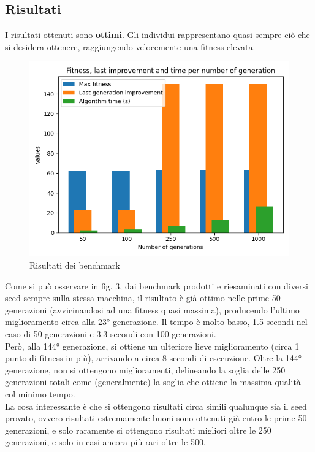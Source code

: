 \documentclass[12pt,titlepage]{article}
\begin{document}
\subsection {Risultati}

I risultati ottenuti sono \textbf{ottimi}. Gli individui rappresentano quasi sempre ciò che si desidera ottenere, raggiungendo velocemente una fitness elevata.\\

\begin{figure}[H]
    \centering
    \includegraphics[width=0.75\linewidth]{assets/benchmark.png}
    \caption{Risultati dei benchmark}
\end{figure}


\noindent Come si può osservare in fig. 3, dai benchmark prodotti e riesaminati con diversi seed sempre sulla stessa macchina, il risultato è già ottimo nelle prime 50 generazioni (avvicinandosi ad una fitness quasi massima), producendo l'ultimo miglioramento circa alla 23° generazione. Il tempo è molto basso, 1.5 secondi nel caso di 50 generazioni e 3.3 secondi con 100 generazioni.\\

\noindent Però, alla 144° generazione, si ottiene un ulteriore lieve miglioramento (circa 1 punto di fitness in più), arrivando a circa 8 secondi di esecuzione. Oltre la 144° generazione, non si ottengono miglioramenti, delineando la soglia delle 250 generazioni totali come (generalmente) la soglia che ottiene la massima qualità col minimo tempo.\\

\noindent La cosa interessante è che si ottengono risultati circa simili qualunque sia il seed provato, ovvero risultati estremamente buoni sono ottenuti già entro le prime 50 generazioni, e solo raramente si ottengono risultati migliori oltre le 250 generazioni, e solo in casi ancora più rari oltre le 500.\\
\end{document}
